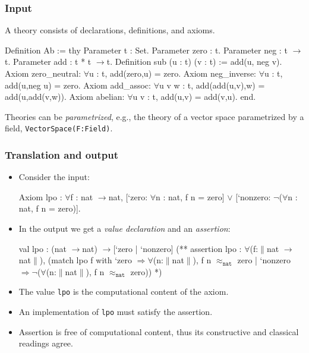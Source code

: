\documentclass[t,handout]{beamer}
\newcommand{\iTo}{{\ensuremath{\to}}}
\newcommand{\iForall}{$\forall$}
\newcommand{\iOr}{$\lor$}
\newcommand{\iImply}{$\Rightarrow$}
\newcommand{\iNot}{$\lnot$}
\newcommand{\iT}[1]{$\|$#1$\|$}
\newcommand{\iPer}[1]{$\approx_{\mathtt{#1}}$}
\begin{document}
\begin{frame}[fragile]
  \frametitle{Input}

  A theory consists of declarations, definitions, and axioms.

\begin{source}
Definition Ab :=
thy
  Parameter t : Set.
  Parameter zero : t.
  Parameter neg : t \iTo t.
  Parameter add : t * t \iTo t.
  Definition sub (u : t) (v : t) := add(u, neg v).
  Axiom zero_neutral: \iForall u : t, add(zero,u) = zero.
  Axiom neg_inverse: \iForall u : t, add(u,neg u) = zero.
  Axiom add_assoc:
   \iForall u v w : t, add(add(u,v),w) = add(u,add(v,w)).
  Axiom abelian: \iForall u v : t, add(u,v) = add(v,u).
end.    
\end{source}

Theories can be \emph{parametrized}, e.g., the theory of a vector
space parametrized by a field, \texttt{VectorSpace(F:Field)}.

\end{frame}


\begin{frame}[fragile]
  \frametitle{Translation and output}

\begin{itemize}[<+->]
\item
  Consider the input:
\begin{source}
Axiom lpo : \iForall f : nat \iTo nat,
  [`zero: \iForall n : nat, f n = zero] \iOr
  [`nonzero: \iNot (\iForall n : nat, f n = zero)].    
\end{source}

\item
  In the output we get a \emph{value declaration} and an \emph{assertion}:
%
\begin{source}
val lpo : (nat \iTo nat) \iTo [`zero | `nonzero]
(**  assertion lpo : 
  \iForall (f:\iT{nat \iTo nat}), 
    (match lpo f with
       `zero \iImply \iForall (n:\iT{nat}), f n \iPer{nat} zero 
     | `nonzero \iImply \iNot (\iForall (n:\iT{nat}), f n \iPer{nat} zero))
*)
\end{source}
\item The value \texttt{lpo} is the computational content of the axiom.
\item An implementation of \texttt{lpo} must satisfy the assertion.
\item Assertion is free of computational content, thus its
  constructive and classical readings agree.
\end{itemize}

\end{frame}
\end{document}
